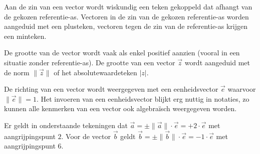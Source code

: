 \documentclass{ximera}
\begin{document}
Aan de zin van een vector wordt wiskundig een teken gekoppeld dat afhangt van de gekozen referentie-as. 
Vectoren in de zin van de gekozen referentie-as worden aangeduid met een plusteken, vectoren tegen de zin van de referentie-as krijgen een minteken. 

De grootte van de vector wordt vaak als enkel positief aanzien (vooral in een situatie zonder referentie-as). %
De grootte van een vector \(\vec{z}\) wordt aangeduid met de norm $ \lVert \vec{z} \rVert $ 
of het absolutewaardeteken
 $\lvert z \rvert $. 







De richting van een vector wordt weergegeven met een eenheidsvector $\vec{e}$ waarvoor $ \lVert \vec{e} \rVert = 1$. 
Het invoeren van een eenheidsvector blijkt erg nuttig in notaties, zo kunnen alle kenmerken van een vector ook algebraïsch weergegeven worden. 

Er geldt in onderstaande tekeningen dat \(\vec{a} = \pm  \lVert \vec{a} \rVert \cdot \vec{e} = +2 \cdot \vec{e} \) met aangrijpingspunt \(2\). 
Voor de vector \(\vec{b}\) geldt \(\vec{b} = \pm  \lVert \vec{b} \rVert \cdot \vec{e} = -1 \cdot \vec{e} \) met aangrijpingspunt \(6\). 

\end{document}
